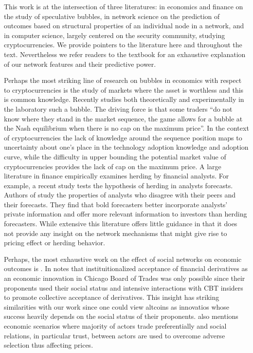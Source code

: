 This work is at the intersection of three literatures: in economics and finance on the study of speculative bubbles, in network science on the prediction of outcomes based on structural properties of an individual node in a network, and in computer science, largely centered on the security community, studying cryptocurrencies.
We provide pointers to the literature here and throughout the text. Nevertheless we refer readers to the textbook \cite{KleinbergNetworks} for an exhaustive explanation of our network features and their predictive power.

Perhaps the most striking line of research on bubbles in economics with respect to cryptocurrencies is the study of markets where the asset is worthless and this is common knowledge. 
Recently \cite{moinas2013bubble} studies both theoretically and experimentally in the laboratory such a bubble. 
The driving force is that some traders ``do not know where they stand in the market sequence, the game allows for
a bubble at the Nash equilibrium when there is no cap on the maximum price''.
In the context of cryptocurrencies the lack of knowledge around the sequence position maps to uncertainty about one's place in the technology adoption knowledge and adoption curve, while the difficulty in upper bounding the potential market value of cryptocurrencies provides the lack of cap on the maximum price. 
A large literature in finance empirically examines herding by financial analysts. For example, a recent study \cite{jegadeesh2009analysts} tests the hypothesis of herding in analysts forecasts. 
Authors of \cite{clement2005financial} study the properties of analysts who disagree with their peers and their forecasts. They find that bold forecasters better incorporate analysts' private information and offer more relevant information to investors than herding forecasters.
While extensive this literature offers little guidance in that it does not provide any insight on the network mechanisms that might give rise to pricing effect or herding behavior.

Perhaps, the most exhaustive work on the effect of social networks on economic outcomes is \cite{Granovetter-outcomes}. In \cite{Granovetter-outcomes} notes that instituitionalized acceptance of financial derivatives as an economic innovation in Chicago Board of Trades was only possible since their proponents used their social status and intensive interactions with CBT insiders to promote collective acceptance of derivatives. This insight has striking similarities with our work since one could view altcoins as innovatios whose success heavily depends on the social status of their proponents. \cite{Granovetter-outcomes} also mentions economic scenarios where majority of actors trade preferentially and social relations, in particular trust, between actors are used to overcome adverse selection thus affecting prices.

